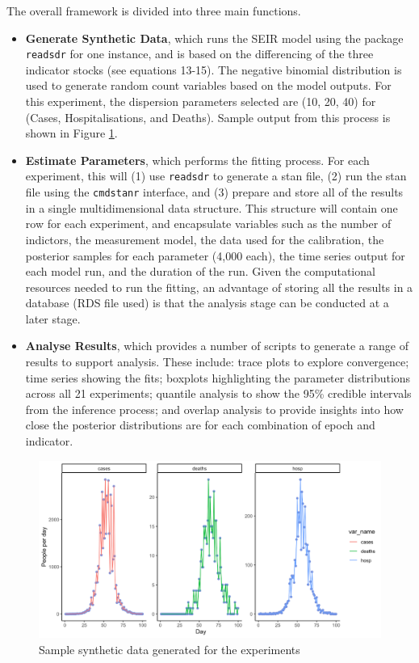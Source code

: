 \documentclass[10pt,letterpaper]{article}
\begin{document}
The overall framework is divided into three main functions.

\begin{itemize}
\item
  \textbf{Generate Synthetic Data}, which runs the SEIR model using the package \texttt{readsdr} for one instance, and is based on the differencing of the three indicator stocks (see equations 13-15). The negative binomial distribution is used to generate random count variables based on the model outputs. For this experiment, the dispersion parameters selected are (10, 20, 40) for (Cases, Hospitalisations, and Deaths). Sample output from this process is shown in Figure \ref{fig:sys-syn}.
\item
  \textbf{Estimate Parameters}, which performs the fitting process. For each experiment, this will (1) use \texttt{readsdr} to generate a stan file, (2) run the stan file using the \texttt{cmdstanr} interface, and (3) prepare and store all of the results in a single multidimensional data structure. This structure will contain one row for each experiment, and encapsulate variables such as the number of indictors, the measurement model, the data used for the calibration, the posterior samples for each parameter (4,000 each), the time series output for each model run, and the duration of the run. Given the computational resources needed to run the fitting, an advantage of storing all the results in a database (RDS file used) is that the analysis stage can be conducted at a later stage.
\item
  \textbf{Analyse Results}, which provides a number of scripts to generate a range of results to support analysis. These include: trace plots to explore convergence; time series showing the fits; boxplots highlighting the parameter distributions across all 21 experiments; quantile analysis to show the 95\% credible intervals from the inference process; and overlap analysis to provide insights into how close the posterior distributions are for each combination of epoch and indicator.
\end{itemize}

\begin{figure}
\includegraphics[width=1\linewidth]{diagrams/sys_synthetic} \caption{Sample synthetic data generated for the experiments}\label{fig:sys-syn}
\end{figure}
\end{document}
